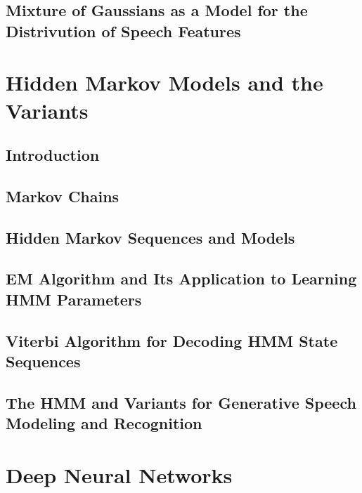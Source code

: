 \documentclass[a4paper]{article}
\begin{document}
\subsection{Mixture of Gaussians as a Model for the Distrivution of Speech Features}


\newpage
\section{Hidden Markov Models and the Variants}
\subsection{Introduction}

\subsection{Markov Chains}

\subsection{Hidden Markov Sequences and Models}

\subsection{EM Algorithm and Its Application to Learning HMM Parameters}

\subsection{Viterbi Algorithm for Decoding HMM State Sequences}

\subsection{The HMM and Variants for Generative Speech Modeling and Recognition}


\newpage
\section{Deep Neural Networks}
\end{document}
